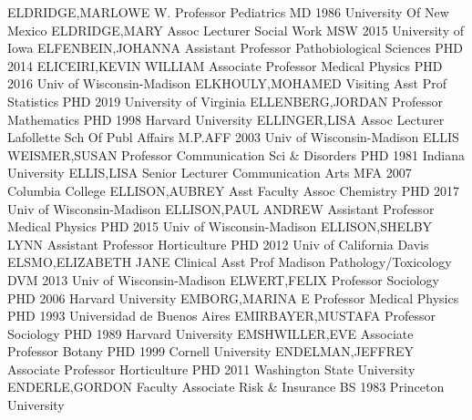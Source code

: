 \documentclass[
]{article}
\begin{document}
\textbar ELDRIDGE,MARLOWE W. \textbar Professor \textbar Pediatrics
\textbar{}  \textbar MD 1986 University Of New Mexico
\textbar ELDRIDGE,MARY \textbar Assoc Lecturer \textbar Social Work
\textbar{}  \textbar MSW 2015 University of Iowa
\textbar ELFENBEIN,JOHANNA \textbar Assistant Professor
\textbar Pathobiological Sciences \textbar{}  \textbar PHD
2014 \textbar ELICEIRI,KEVIN WILLIAM \textbar Associate Professor
\textbar Medical Physics \textbar{}  \textbar PHD 2016 Univ
of Wisconsin-Madison \textbar ELKHOULY,MOHAMED \textbar Visiting Asst
Prof \textbar Statistics \textbar{}  \textbar PHD 2019
University of Virginia \textbar ELLENBERG,JORDAN \textbar Professor
\textbar Mathematics \textbar{}  \textbar PHD 1998 Harvard
University \textbar ELLINGER,LISA \textbar Assoc Lecturer
\textbar Lafollette Sch Of Publ Affairs \textbar{} 
\textbar M.P.AFF 2003 Univ of Wisconsin-Madison \textbar ELLIS
WEISMER,SUSAN \textbar Professor \textbar Communication Sci \& Disorders
\textbar{}  \textbar PHD 1981 Indiana University
\textbar ELLIS,LISA \textbar Senior Lecturer \textbar Communication Arts
\textbar{}  \textbar MFA 2007 Columbia College
\textbar ELLISON,AUBREY \textbar Asst Faculty Assoc \textbar Chemistry
\textbar{}  \textbar PHD 2017 Univ of Wisconsin-Madison
\textbar ELLISON,PAUL ANDREW \textbar Assistant Professor
\textbar Medical Physics \textbar{}  \textbar PHD 2015 Univ
of Wisconsin-Madison \textbar ELLISON,SHELBY LYNN \textbar Assistant
Professor \textbar Horticulture \textbar{}  \textbar PHD 2012
Univ of California Davis \textbar ELSMO,ELIZABETH JANE \textbar Clinical
Asst Prof \textbar Madison Pathology/Toxicology \textbar{} 
\textbar DVM 2013 Univ of Wisconsin-Madison \textbar ELWERT,FELIX
\textbar Professor \textbar Sociology \textbar{} 
\textbar PHD 2006 Harvard University \textbar EMBORG,MARINA E
\textbar Professor \textbar Medical Physics \textbar{} 
\textbar PHD 1993 Universidad de Buenos Aires \textbar EMIRBAYER,MUSTAFA
\textbar Professor \textbar Sociology \textbar{} 
\textbar PHD 1989 Harvard University \textbar EMSHWILLER,EVE
\textbar Associate Professor \textbar Botany \textbar{} 
\textbar PHD 1999 Cornell University \textbar ENDELMAN,JEFFREY
\textbar Associate Professor \textbar Horticulture \textbar{}
 \textbar PHD 2011 Washington State University
\textbar ENDERLE,GORDON \textbar Faculty Associate \textbar Risk \&
Insurance \textbar{}  \textbar BS 1983 Princeton University
\end{document}
